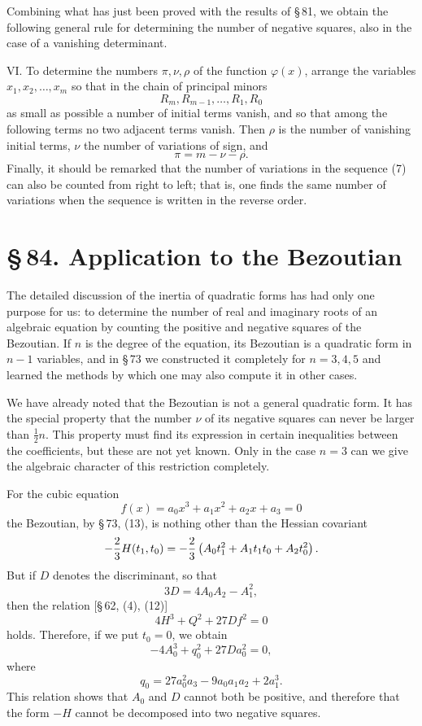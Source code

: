 \documentclass[11pt]{article}
\providecommand{\sect}[2]{\section*{\S\,#1. #2}}
\begin{document}
Combining what has just been proved with the results of \S\,81, we obtain the following general rule for determining the number of negative squares, also in the case of a vanishing determinant.

VI. To determine the numbers $\pi,\nu,\rho$ of the function $\varphi(x)$, arrange the variables $x_1,x_2,
\ldots,x_m$ so that in the chain of principal minors
\begin{equation}
        R_m,
        R_{m-1},
        \ldots,R_1,R_0
\tag{7}
\end{equation}
as small as possible a number of initial terms vanish, and so that among the following terms no two adjacent terms vanish. Then $\rho$ is the number of vanishing initial terms, $\nu$ the number of variations of sign, and
\[
        \pi=m-\nu-\rho.
\]
Finally, it should be remarked that the number of variations in the sequence (7) can also be counted from right to left; that is, one finds the same number of variations when the sequence is written in the reverse order.

\sect{84}{Application to the Bezoutian}

The detailed discussion of the inertia of quadratic forms has had only one purpose for us: to determine the number of real and imaginary roots of an algebraic equation by counting the positive and negative squares of the Bezoutian. If $n$ is the degree of the equation, its Bezoutian is a quadratic form in $n-1$ variables, and in \S\,73 we constructed it completely for $n=3,4,5$ and learned the methods by which one may also compute it in other cases.

We have already noted that the Bezoutian is not a general quadratic form. It has the special property that the number $\nu$ of its negative squares can never be larger than $\frac12 n$. This property must find its expression in certain inequalities between the coefficients, but these are not yet known. Only in the case $n=3$ can we give the algebraic character of this restriction completely.

For the cubic equation
\[
        f(x)=a_0x^3+a_1x^2+a_2x+a_3=0
\]
the Bezoutian, by \S\,73, (13), is nothing other than the Hessian covariant
\[
        -{2\over3}H(t_1,t_0)=-{2\over3}\left(A_0t_1^2+A_1t_1t_0+A_2t_0^2\right).
\]
But if $D$ denotes the discriminant, so that
\[
        3D=4A_0A_2-A_1^2,
\]
then the relation [\S\,62, (4), (12)]
\[
        4H^3+Q^2+27Df^2=0
\]
holds. Therefore, if we put $t_0=0$, we obtain
\begin{equation}
        -4A_0^3+q_0^2+27Da_0^2=0,
\tag{1}
\end{equation}
where
\[
        q_0=27a_0^2a_3-9a_0a_1a_2+2a_1^3.
\]
This relation shows that $A_0$ and $D$ cannot both be positive, and therefore that the form $-H$ cannot be decomposed into two negative squares.
\end{document}

